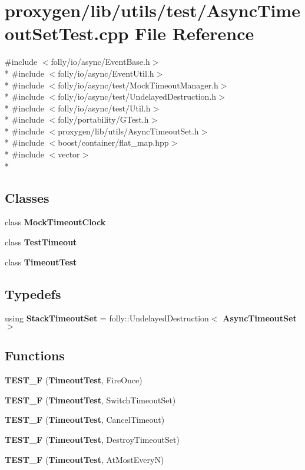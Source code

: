 \section{proxygen/lib/utils/test/\+Async\+Timeout\+Set\+Test.cpp File Reference}
\label{AsyncTimeoutSetTest_8cpp}
{\ttfamily \#include $<$folly/io/async/\+Event\+Base.\+h$>$}\\*
{\ttfamily \#include $<$folly/io/async/\+Event\+Util.\+h$>$}\\*
{\ttfamily \#include $<$folly/io/async/test/\+Mock\+Timeout\+Manager.\+h$>$}\\*
{\ttfamily \#include $<$folly/io/async/test/\+Undelayed\+Destruction.\+h$>$}\\*
{\ttfamily \#include $<$folly/io/async/test/\+Util.\+h$>$}\\*
{\ttfamily \#include $<$folly/portability/\+G\+Test.\+h$>$}\\*
{\ttfamily \#include $<$proxygen/lib/utils/\+Async\+Timeout\+Set.\+h$>$}\\*
{\ttfamily \#include $<$boost/container/flat\+\_\+map.\+hpp$>$}\\*
{\ttfamily \#include $<$vector$>$}\\*
\subsection*{Classes}
\begin{DoxyCompactItemize}
\item 
class {\bf Mock\+Timeout\+Clock}
\item 
class {\bf Test\+Timeout}
\item 
class {\bf Timeout\+Test}
\end{DoxyCompactItemize}
\subsection*{Typedefs}
\begin{DoxyCompactItemize}
\item 
using {\bf Stack\+Timeout\+Set} = folly\+::\+Undelayed\+Destruction$<$ {\bf Async\+Timeout\+Set} $>$
\end{DoxyCompactItemize}
\subsection*{Functions}
\begin{DoxyCompactItemize}
\item 
{\bf T\+E\+S\+T\+\_\+F} ({\bf Timeout\+Test}, Fire\+Once)
\item 
{\bf T\+E\+S\+T\+\_\+F} ({\bf Timeout\+Test}, Switch\+Timeout\+Set)
\item 
{\bf T\+E\+S\+T\+\_\+F} ({\bf Timeout\+Test}, Cancel\+Timeout)
\item 
{\bf T\+E\+S\+T\+\_\+F} ({\bf Timeout\+Test}, Destroy\+Timeout\+Set)
\item 
{\bf T\+E\+S\+T\+\_\+F} ({\bf Timeout\+Test}, At\+Most\+EveryN)
\end{DoxyCompactItemize}


